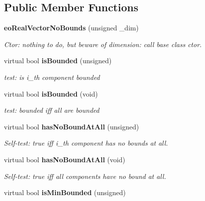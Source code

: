 \subsection*{Public Member Functions}
\begin{CompactItemize}
\item 
{\bf eo\-Real\-Vector\-No\-Bounds} (unsigned \_\-dim)\label{classeo_real_vector_no_bounds_a1}

\begin{CompactList}\small\item\em Ctor: nothing to do, but beware of dimension: call base class ctor. \item\end{CompactList}\item 
virtual bool {\bf is\-Bounded} (unsigned)\label{classeo_real_vector_no_bounds_a2}

\begin{CompactList}\small\item\em test: is i\_\-th component bounded \item\end{CompactList}\item 
virtual bool {\bf is\-Bounded} (void)\label{classeo_real_vector_no_bounds_a3}

\begin{CompactList}\small\item\em test: bounded iff all are bounded \item\end{CompactList}\item 
virtual bool {\bf has\-No\-Bound\-At\-All} (unsigned)\label{classeo_real_vector_no_bounds_a4}

\begin{CompactList}\small\item\em Self-test: true iff i\_\-th component has no bounds at all. \item\end{CompactList}\item 
virtual bool {\bf has\-No\-Bound\-At\-All} (void)\label{classeo_real_vector_no_bounds_a5}

\begin{CompactList}\small\item\em Self-test: true iff all components have no bound at all. \item\end{CompactList}\item 
virtual bool {\bf is\-Min\-Bounded} (unsigned)\label{classeo_real_vector_no_bounds_a6}


\end{CompactItemize}
